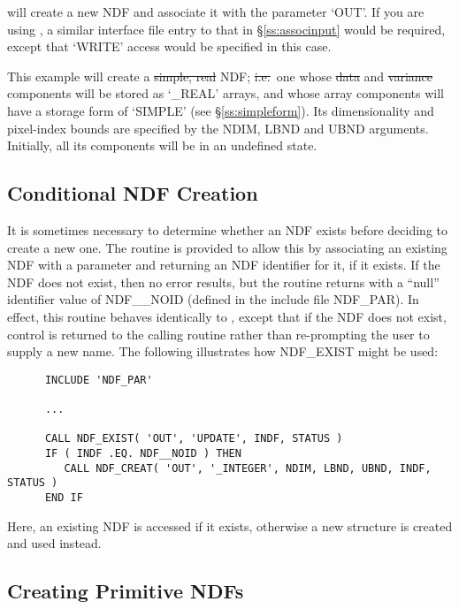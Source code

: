 will create a new NDF and associate it with the parameter `OUT'.  If
you are using , a similar interface file entry to that in
\S\ref{ss:associnput} would be required, except that `WRITE' access
would be specified in this case.

This example will create a \st{simple, real\/} NDF; \st{i.e.}\ one whose
\st{data\/} and \st{variance\/} components will be stored as `\_REAL'
arrays, and whose array components will have a storage form of `SIMPLE' (see
\S\ref{ss:simpleform}). 
Its dimensionality and pixel-index bounds are specified by the NDIM, LBND
and UBND arguments. 
Initially, all its components will be in an undefined state.

\subsection{\label{ss:exist}Conditional NDF Creation}

It is sometimes necessary to determine whether an NDF exists before deciding
to create a new one. 
The routine  is provided to allow this by associating an existing
NDF with a parameter and returning an NDF identifier for it, if it
exists. 
If the NDF does not exist, then no error results, but the routine returns
with a ``null'' identifier value of NDF\_\_NOID (defined in the include file
NDF\_PAR). 
In effect, this routine behaves identically to , except that if
the NDF does not exist, control is returned to the calling routine rather
than re-prompting the user to supply a new name. 
The following illustrates how NDF\_EXIST might be used:

\small
\begin{verbatim}
      INCLUDE 'NDF_PAR'

      ...

      CALL NDF_EXIST( 'OUT', 'UPDATE', INDF, STATUS )
      IF ( INDF .EQ. NDF__NOID ) THEN
         CALL NDF_CREAT( 'OUT', '_INTEGER', NDIM, LBND, UBND, INDF, STATUS )
      END IF
\end{verbatim}
\normalsize

Here, an existing NDF is accessed if it exists, otherwise a new structure
is created and used instead. 

\subsection{\label{ss:crep}Creating Primitive NDFs}

